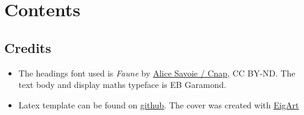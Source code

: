 \setcounter{tocdepth}{1}
\chapter*{Contents}

\begingroup
    \renewcommand{\contentsname}{Table of Contents}
    {
        \let\chapter\section{\hypersetup{linkcolor=black}\tableofcontents}
    }
    { {}}
\endgroup

\vspace*{2em}
\printnoidxglossary[
    style=mcolacr,
    type=\acronymtype,nonumberlist,nogroupskip,
    numberedsection=false,title=List of Acronyms]
\vspace*{2em}

{\fontsize{9}{9}\selectfont \hypersetup{linkcolor=black}\listoffigures} 
{ {}}

\section*{Credits}
\begin{itemize}
    \item The headings font used is {{\fontsize{12}{12}\titlestyle\itshape Faune} by \href{https://www.cnap.fr/sites/faune/}{\color{accent} \underline{Alice Savoie / Cnap}}, CC BY-ND}. The text body and display maths typeface is EB Garamond.
    \item Latex template can be found on \href{https://github.com/marecmat/manuscrit_these}{\color{accent} \underline{github}}. The cover was created with \href{https://rocher-ensoleille.fr/data/eigart.py}{\color{accent} \underline{EigArt}}
\end{itemize}